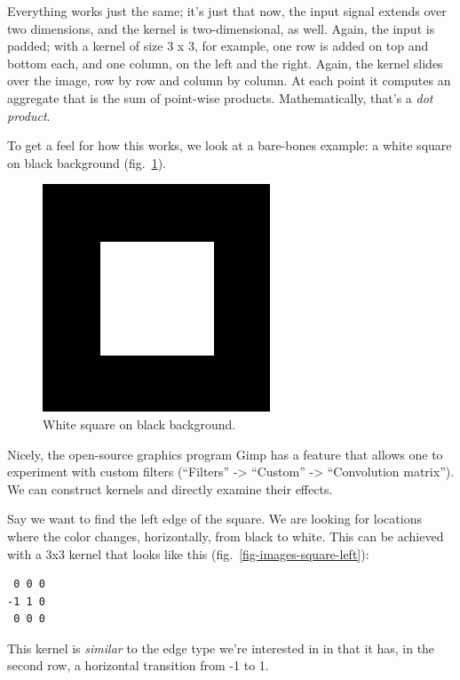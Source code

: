 \documentclass[
  letterpaper,
]{krantz}
\begin{document}
Everything works just the same; it's just that now, the input signal
extends over two dimensions, and the kernel is two-dimensional, as well.
Again, the input is padded; with a kernel of size 3 x 3, for example,
one row is added on top and bottom each, and one column, on the left and
the right. Again, the kernel slides over the image, row by row and
column by column. At each point it computes an aggregate that is the sum
of point-wise products. Mathematically, that's a \emph{dot product}.

To get a feel for how this works, we look at a bare-bones example: a
white square on black background (fig.~\ref{fig-images-square}).

\begin{figure}[H]

{\centering \includegraphics{images/images-square.png}

}

\caption{\label{fig-images-square}White square on black background.}

\end{figure}

Nicely, the open-source graphics program Gimp has a feature that allows
one to experiment with custom filters (``Filters'' -\textgreater{}
``Custom'' -\textgreater{} ``Convolution matrix''). We can construct
kernels and directly examine their effects.

Say we want to find the left edge of the square. We are looking for
locations where the color changes, horizontally, from black to white.
This can be achieved with a 3x3 kernel that looks like this
(fig.~\ref{fig-images-square-left}):

\begin{verbatim}
 0 0 0
-1 1 0
 0 0 0
\end{verbatim}

This kernel is \emph{similar} to the edge type we're interested in in
that it has, in the second row, a horizontal transition from -1 to 1.
\end{document}

